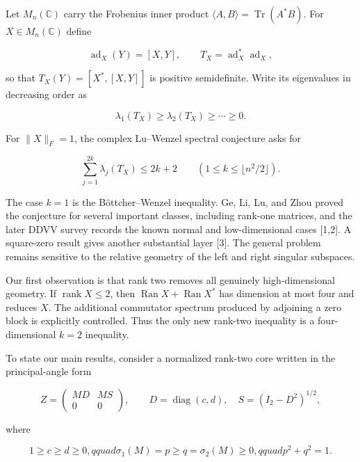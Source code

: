 \documentclass[11pt]{article}
\begin{document}
Let $M_n(\mathbb C)$ carry the Frobenius inner product $\langle A,B\rangle=\operatorname{Tr}(A^*B)$. For $X\in M_n(\mathbb C)$ define

\begin{equation}
\operatorname{ad}_X(Y)=[X,Y],\qquad
T_X=\operatorname{ad}_X^*\operatorname{ad}_X,
\tag{1.1}
\end{equation}

so that $T_X(Y)=[X^*,[X,Y]]$ is positive semidefinite. Write its eigenvalues in decreasing order as

\[
\lambda_1(T_X)\ge\lambda_2(T_X)\ge\cdots\ge0.
\]

For $\|X\|_F=1$, the complex Lu--Wenzel spectral conjecture asks for

\begin{equation}
\sum_{j=1}^{2k}\lambda_j(T_X)\le 2k+2
\qquad (1\le k\le \lfloor n^2/2\rfloor).
\tag{1.2}
\end{equation}

The case $k=1$ is the Böttcher--Wenzel inequality. Ge, Li, Lu, and Zhou proved the conjecture for several important classes, including rank-one matrices, and the later DDVV survey records the known normal and low-dimensional cases [1,2]. A square-zero result gives another substantial layer [3]. The general problem remains sensitive to the relative geometry of the left and right singular subspaces.

Our first observation is that rank two removes all genuinely high-dimensional geometry. If $\operatorname{rank}X\le2$, then $\operatorname{Ran}X+\operatorname{Ran}X^*$ has dimension at most four and reduces $X$. The additional commutator spectrum produced by adjoining a zero block is explicitly controlled. Thus the only new rank-two inequality is a four-dimensional $k=2$ inequality.

To state our main results, consider a normalized rank-two core written in the principal-angle form

\begin{equation}
Z=\begin{pmatrix}MD&MS\\0&0\end{pmatrix},
\qquad
D=\operatorname{diag}(c,d),\quad
S=(I_2-D^2)^{1/2},
\tag{1.3}
\end{equation}

where

\begin{equation}
1\ge c\ge d\ge0,qquad
\sigma_1(M)=p\ge q=\sigma_2(M)\ge0,qquad
p^2+q^2=1.
\tag{1.4}
\end{equation}
\end{document}
